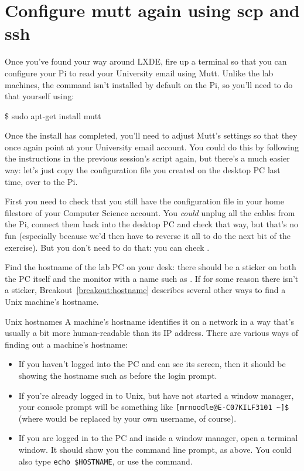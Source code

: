 \section{Configure mutt again using scp and ssh}

Once you've found your way around LXDE, fire up a terminal so that you can configure your Pi to read your University email using Mutt. Unlike the lab machines, the  command isn't installed by default on the Pi, so you'll need to do that yourself using:

\begin{ttoutenv}
\$ sudo apt-get install mutt
\end{ttoutenv}

Once the install has completed, you'll need to adjust Mutt's settings so that they once again point at your University email account. You could do this by following the instructions in the previous session's script again, but there's a much easier way: let's just copy the configuration file you created on the desktop PC last time, over to the Pi.

First you need to check that you still have the  configuration file in your home filestore of your Computer Science account. You \textit{could} unplug all the cables from the Pi, connect them back into the desktop PC and check that way, but that's no fun (especially because we'd then have to reverse it all to do the next bit of the exercise). But you don't need to do that: you can check .

Find the hostname of the lab PC on your desk: there should be a sticker on both the PC itself and the monitor with a name such as . If for some reason there isn't a sticker, Breakout~\ref{breakout:hostname} describes  several other ways to find a Unix machine's hostname.

\begin{linux}{Unix hostnames}
\label{breakout:hostname}
A machine's hostname identifies it on a network in a way that's usually a bit more human-readable than its IP address. There are various ways of finding out a machine's hostname:

\begin{itemize}
\item If you haven't logged into the PC and can see its screen, then it should be showing the hostname such as  before the login prompt.
\item If you're already logged in to Unix, but have not started a window manager, your console prompt will be something like  \verb|[mrnoodle@E-C07KILF3101 ~]$| (where  would be replaced by your own username, of course).
\item If you are logged in to the PC and inside a window manager, open a terminal window. It should show you the command line prompt, as above. You could also type \verb|echo $HOSTNAME|, or use the  command.
\end{itemize}
\end{linux}

